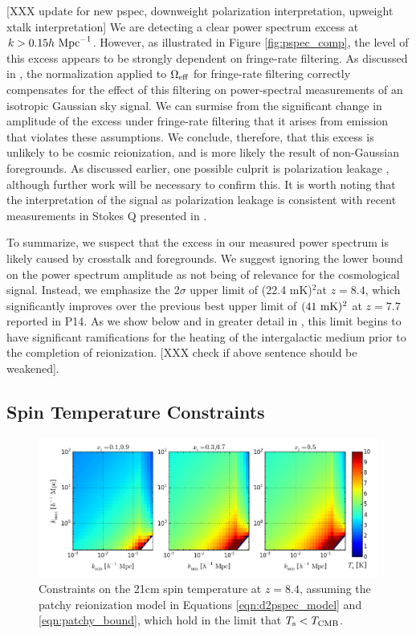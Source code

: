 \documentclass[twocolumn,numberedappendix]{emulateapj} \shorttitle{New Limits on the 21 cm Power Spectrum at $z=8.4$}
\newcommand{\hMpci}{h\ {\rm Mpc}^{-1}}
\newcommand{\mKlimit}{(22.4 mK)$^2$}
\begin{document}
[XXX update for new pspec, downweight polarization interpretation, upweight xtalk interpretation]
We are 
detecting a clear power spectrum excess at $k>0.15\hMpci$.  However, as illustrated
in Figure \ref{fig:pspec_comp}, the level of this excess appears to be
strongly dependent on fringe-rate filtering.  As discussed in \citet{parsons_et_al2015},
the normalization applied to $\Omega_{\rm eff}$ for fringe-rate filtering correctly
compensates for the effect of this filtering on power-spectral measurements
of an isotropic Gaussian sky signal.  We can surmise from the significant change in amplitude of the excess
under fringe-rate filtering that it arises from emission that violates these assumptions.
We conclude, therefore, that this excess is unlikely to be cosmic reionization, and is more
likely the result of non-Gaussian foregrounds.  As discussed earlier, one possible
culprit is polarization leakage \citep{moore_et_al2013,jelic_et_al2010,jelic_et_al2014}, although further
work will be necessary to confirm this.  It is worth noting that the interpretation of
the signal as polarization leakage is consistent with recent measurements in Stokes Q presented
in \citet{moore_et_al2015}.


To summarize, we suspect that the excess in our measured power spectrum is likely caused
by crosstalk and foregrounds.  We suggest ignoring the lower bound on the power spectrum amplitude
as not being of relevance for the cosmological signal.  Instead, we emphasize the 
2$\sigma$ upper limit of \mKlimit at $z=8.4$, which significantly improves over the previous
best upper limit of $(41~{\rm mK})^2$ at $z=7.7$ reported in P14.  As we show below and in
greater detail in \citet{pober_et_al2015}, this limit begins to have significant ramifications
for the heating of the intergalactic medium prior to the completion of reionization.
[XXX check if above sentence should be weakened].

\subsection{Spin Temperature Constraints}

\begin{figure}\centering
\includegraphics[width=2\columnwidth]{plots/ts_patchy_bound.png}
\caption{Constraints on the 21cm spin temperature at $z=8.4$, 
assuming 
the patchy reionization model in Equations
\eqref{eqn:d2pspec_model} and \eqref{eqn:patchy_bound}, which hold in the limit
that $T_{\rm s}<T_{\rm CMB}$.
} \label{fig:patchy_bound}
\end{figure}
\end{document}

